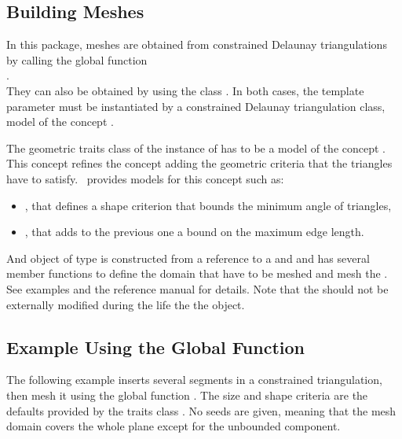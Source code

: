 \subsection{Building Meshes}
\label{sec:Mesh_2_building_meshes}

In this package, meshes are obtained from
constrained Delaunay triangulations by calling the global function \\
. \\
They can also be obtained by using the class .
In both cases, the template parameter  must be instantiated by a
constrained Delaunay triangulation class, model of the concept
.

The geometric traits class of the instance of  has to be a
model of the concept .  This concept
refines the concept 
adding the geometric criteria that the triangles have to satisfy.
\cgal\ provides models for this concept such as:
\begin{itemize}
\item {}, that defines a shape criterion
  that bounds the minimum angle of triangles, 
\item {}, that adds to the previous one a
  bound on the maximum edge length.
\end{itemize}

And object of type  is constructed from a
reference to a  and and has several member functions to define the
domain that have to be meshed and mesh the . See examples and the
reference manual for details. Note that the  should not be
externally modified during the life the the 
object.

\subsection{Example Using the Global Function}

The following example inserts several segments in a constrained
triangulation, then mesh it using the global function
. The size and shape criteria are the defaults
provided by the traits class . No seeds are
given, meaning that the mesh domain covers the whole plane except for the
unbounded component.

